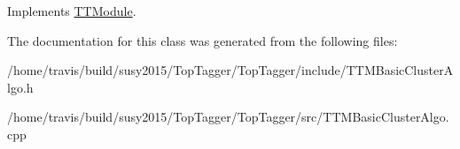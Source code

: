 Implements \hyperlink{classTTModule_a14e7c03fbf4ee1a5008c9344adc7c896}{T\-T\-Module}.



The documentation for this class was generated from the following files\-:\begin{DoxyCompactItemize}
\item 
/home/travis/build/susy2015/\-Top\-Tagger/\-Top\-Tagger/include/T\-T\-M\-Basic\-Cluster\-Algo.\-h\item 
/home/travis/build/susy2015/\-Top\-Tagger/\-Top\-Tagger/src/T\-T\-M\-Basic\-Cluster\-Algo.\-cpp\end{DoxyCompactItemize}
